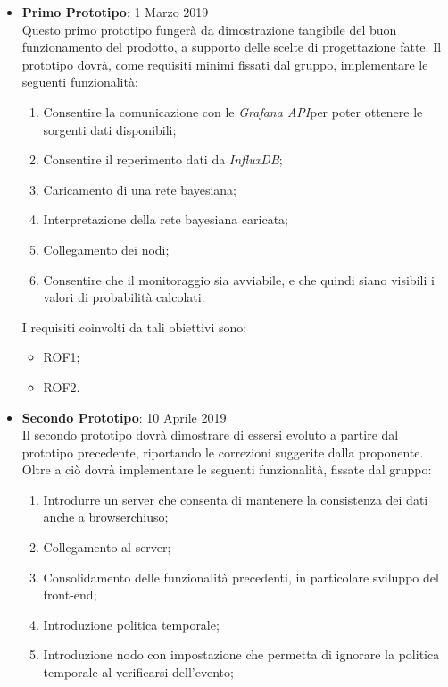 \begin{itemize}
	\item \textbf{Primo Prototipo}: 1 Marzo 2019\\
	Questo primo prototipo fungerà da dimostrazione tangibile del buon funzionamento del prodotto, a supporto
	delle scelte di progettazione fatte. Il prototipo dovrà, come requisiti minimi fissati dal gruppo, implementare le seguenti funzionalità:
	\begin{enumerate}	%
		\item Consentire la comunicazione con le \textit{Grafana API}\glossario per poter ottenere le sorgenti dati disponibili;
		\item Consentire il reperimento dati da \textit{InfluxDB}\glossario;
		\item Caricamento di una rete bayesiana;
		\item Interpretazione della rete bayesiana caricata;
		\item Collegamento dei nodi;
		\item Consentire che il monitoraggio sia avviabile, e che quindi siano visibili i valori di probabilità calcolati.
	\end{enumerate}
	I requisiti coinvolti da tali obiettivi sono:
	\begin{itemize}
		\item ROF1;
		\item ROF2.
	\end{itemize}
	\item \textbf{Secondo Prototipo}: 10 Aprile 2019\\
	Il secondo prototipo dovrà dimostrare di essersi evoluto a partire dal prototipo precedente, riportando le correzioni suggerite dalla proponente. Oltre a ciò dovrà implementare le seguenti funzionalità, fissate dal gruppo:
	\begin{enumerate} %
		\item Introdurre un server che consenta di mantenere la consistenza dei dati anche a browser\glossario chiuso;
		\item Collegamento al server;
		\item Consolidamento delle funzionalità precedenti, in particolare sviluppo del front-end;
		\item Introduzione politica temporale;
		\item Introduzione nodo con impostazione che permetta di ignorare la politica temporale al verificarsi dell'evento;

\end{enumerate}
\end{itemize}
